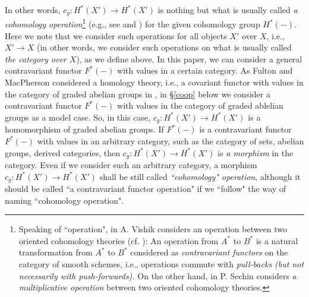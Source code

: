 \documentclass[a4paper]{amsart}
\begin{document}
In other words, $c_g: H^*(X') \to H^*(X')$ is nothing but what is usually called \emph{a cohomology operation}\footnote{Speaking of ``operation", in \cite{Vishik2} A. Vishik considers an operation between two oriented cohomology theories \cite{LM}(cf. \cite{LP}): An operation from $A^*$ to $B^*$ is a natural transformation from $A^*$ to $B^*$ considered as \emph{contravariant functors} on the category of smooth schemes, i.e., operations commute with \emph{pull-backs (but not necessarily with push-forwards).} On the other hand, in \cite{Sechin} P. Sechin considers \emph{a multiplicative operation} between two oriented cohomology theories.} (e.g., see \cite{Steenrod1, Steenrod2, Steenrod3} and \cite{nLab2}) for the given cohomology group $H^*(-)$. Here we note that we consider such operations for all objects $X'$ over $X$, i.e., $X' \to X$ (in other words, we consider such operations on what is usually called \emph{the category over $X$}), as we define above. In this paper, we can consider a general contravariant functor $F^*(-)$ with values in a certain category. As Fulton and MacPherson considered a homology theory, i.e., a covariant functor with values in the category of graded abelian groups in \cite[\S 8.1]{FM}, in \S \ref{coop} below we consider a contravariant functor $F^*(-)$ with values in the category of graded ablelian groups as a model case. So, in this case, $c_g: H^*(X') \to H^*(X')$ is a homomorphism of graded abelian groups. If $F^*(-)$ is a contravariant functor $F^*(-)$ with values in an arbitrary category, such as the category of sets, abelian groups, derived categories, then  $c_g: H^*(X') \to H^*(X')$ is \emph{a morphism} in the category. Even if we consider such an arbitrary category, a morphism $c_g: H^*(X') \to H^*(X')$  shall be still called \emph{``cohomology" operation}, although it should be called ``a contravariant functor operation" if we ``follow" the way of naming ``cohomology operation". 
\end{document}
